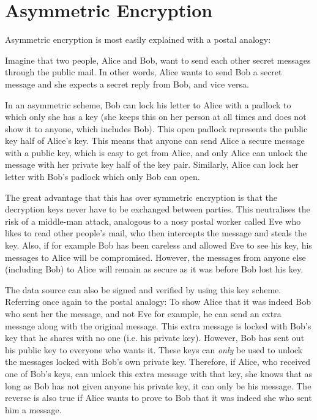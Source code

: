 \chapter{Asymmetric Encryption}
\label{app:ass-encryption}

Asymmetric encryption is most easily explained with a postal analogy:

Imagine that two people, Alice and Bob, want to send each other secret messages through
the public mail. In other words, Alice wants to send Bob a secret message and she expects
a secret reply from Bob, and vice versa. 

In an asymmetric scheme, Bob can lock his letter to Alice with a padlock to which only she has
a key (she keeps this on her person at all times and does not show it to anyone, which
includes Bob). This open padlock represents the public key half of Alice's key. This
means that anyone can send Alice a secure message with a public key, which is easy to
get from Alice, and only Alice can unlock the message with her private key half of the
key pair. Similarly, Alice can lock her letter with Bob's padlock which only Bob can open.

The great advantage that this has over symmetric encryption is that the decryption keys never
have to be exchanged between parties. This neutralises the risk of a middle-man attack,
analogous to a nosy postal worker called Eve who likes to read other people's
mail, who then intercepts the message and steals the key. Also, if for example Bob has
been careless and allowed Eve to see his key, his messages to Alice will be
compromised. However, the messages from anyone else (including Bob) to Alice
will remain as secure as it was before Bob lost his key.

The data source can also be signed and verified by using this key scheme. Referring once again
to the postal analogy: To show Alice that it was indeed Bob who sent her the
message, and not Eve for example, he can send an extra message along with the
original message. This extra message is locked with Bob's key that he shares
with no one (i.e. his private key). However, Bob has sent out his public key to
everyone who wants it. These keys can \emph{only} be used to unlock the
messages locked with Bob's own private key. Therefore, if Alice, who received
one of Bob's keys, can unlock this extra message with that key, she knows that
as long as Bob has not given anyone his private key, it can only be his
message. The reverse is also true if Alice wants to prove to Bob that it was
indeed she who sent him a message.
